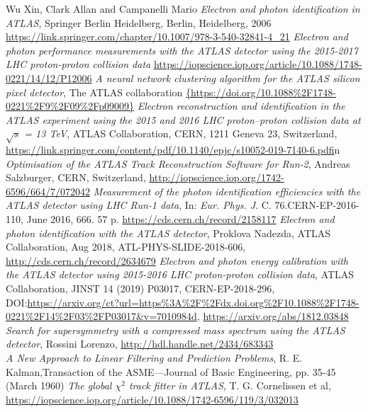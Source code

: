 \documentclass[a4paper, oneside, 11pt, openright]{book}
\begin{document}
\begin{thebibliography}{32}
			 Wu Xin, Clark Allan and Campanelli Mario \textit{Electron and photon identification in ATLAS}, Springer Berlin Heidelberg, Berlin, Heidelberg, 2006
			\url{https://link.springer.com/chapter/10.1007/978-3-540-32841-4_21} 
			\textit{Electron and photon performance measurements with the {ATLAS} detector using the 2015-2017 {LHC} proton-proton collision data}
			\url{https://iopscience.iop.org/article/10.1088/1748-0221/14/12/P12006}
			 \textit{A neural network clustering algorithm for the ATLAS silicon pixel detector}, The ATLAS collaboration
			\url{{https://doi.org/10.1088%2F1748-0221%2F9%2F09%2Fp09009}}
			\textit{Electron reconstruction and identification in the ATLAS experiment using the 2015 and 2016 LHC proton–proton collision data at $\sqrt{s}$ = 13 TeV}, ATLAS Collaboration, CERN, 1211 Geneva 23, Switzerland,
			\url{https://link.springer.com/content/pdf/10.1140/epjc/s10052-019-7140-6.pdf}in
			 \textit{Optimisation of the ATLAS Track Reconstruction Software for Run-2}, Andreas Salzburger, CERN, Switzerland, \url{http://iopscience.iop.org/1742-6596/664/7/072042}
			\textit{Measurement of the photon identification efficiencies with the ATLAS detector using LHC Run-1 data}, In: \textit{Eur. Phys. J}. C. 76.CERN-EP-2016-110, June 2016, 666. 57 p. 
			\url{https://cds.cern.ch/record/2158117} 
			 \textit{Electron and photon identification with the ATLAS detector}, Proklova Nadezda, ATLAS Collaboration, Aug 2018, ATL-PHYS-SLIDE-2018-606, \url{http://cds.cern.ch/record/2634679}
			\textit{Electron and photon energy calibration with the ATLAS detector using 2015-2016 LHC proton-proton collision data}, ATLAS Collaboration, JINST 14 (2019) P03017, CERN-EP-2018-296,  DOI:\url{https://arxiv.org/ct?url=https%3A%2F%2Fdx.doi.org%2F10.1088%2F1748-0221%2F14%2F03%2FP03017&v=7010984d}, 
			\url{https://arxiv.org/abs/1812.03848}
			 \textit{Search for supersymmetry with a compressed mass spectrum using the ATLAS detector}, Rossini Lorenzo, \url{http://hdl.handle.net/2434/683343 }\\
			 \textit{A New Approach to Linear Filtering and Prediction Problems}, R. E. Kalman,Transaction of the ASME—Journal of Basic Engineering,
			pp. 35-45 (March 1960)
			\textit{The global $\chi^2$ track fitter in ATLAS}, T. G. Cornelissen et al, \url{https://iopscience.iop.org/article/10.1088/1742-6596/119/3/032013}

\end{thebibliography}
\end{document}
